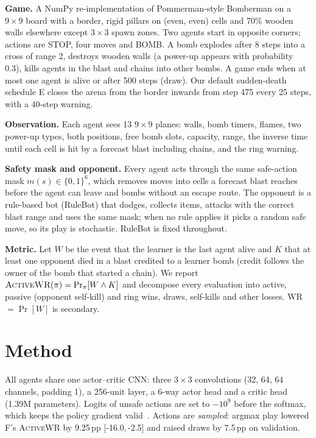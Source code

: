 \documentclass[conference]{IEEEtran}
\newcommand{\awr}{\textsc{ActiveWR}}
\newcommand{\pp}{\,pp}
\newcommand{\ci}[2]{[#1,\,#2]}
\begin{document}
\textbf{Game.} A NumPy re-implementation of Pommerman-style Bomberman on a $9\times9$ board with a border, rigid pillars on (even, even) cells and 70\% wooden walls elsewhere except $3\times3$ spawn zones. Two agents start in opposite corners; actions are STOP, four moves and BOMB. A bomb explodes after 8 steps into a cross of range 2, destroys wooden walls (a power-up appears with probability 0.3), kills agents in the blast and chains into other bombs. A game ends when at most one agent is alive or after 500 steps (draw). Our default sudden-death schedule E closes the arena from the border inwards from step 475 every 25 steps, with a 40-step warning.

\textbf{Observation.} Each agent sees 13 $9\times9$ planes: walls, bomb timers, flames, two power-up types, both positions, free bomb slots, capacity, range, the inverse time until each cell is hit by a forecast blast including chains, and the ring warning.

\textbf{Safety mask and opponent.} Every agent acts through the same safe-action mask $m(s)\in\{0,1\}^6$, which removes moves into cells a forecast blast reaches before the agent can leave and bombs without an escape route. The opponent is a rule-based bot (RuleBot) that dodges, collects items, attacks with the correct blast range and uses the same mask; when no rule applies it picks a random safe move, so its play is stochastic. RuleBot is fixed throughout.

\textbf{Metric.} Let $W$ be the event that the learner is the last agent alive and $K$ that at least one opponent died in a blast credited to a learner bomb (credit follows the owner of the bomb that started a chain). We report $\awr{}(\pi)=\Pr_{\pi}[W\wedge K]$ and decompose every evaluation into active, passive (opponent self-kill) and ring wins, draws, self-kills and other losses. WR $=\Pr[W]$ is secondary.

\section{Method}

All agents share one actor--critic CNN: three $3\times3$ convolutions (32, 64, 64 channels, padding 1), a 256-unit layer, a 6-way actor head and a critic head (1.39M parameters). Logits of unsafe actions are set to $-10^9$ before the softmax, which keeps the policy gradient valid~\cite{huang2022masking}. Actions are \emph{sampled}: argmax play lowered F's \awr{} by 9.25\pp{} \ci{-16.0}{-2.5} and raised draws by 7.5\pp{} on validation.
\end{document}
